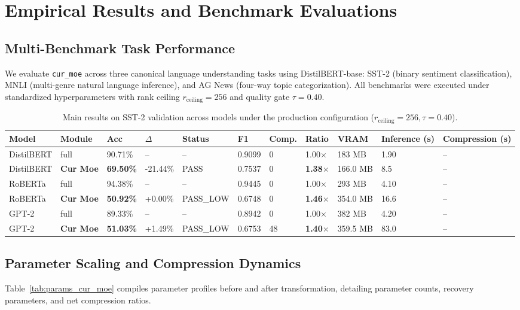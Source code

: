 \section{Empirical Results and Benchmark Evaluations}
\label{sec:results}

\subsection{Multi-Benchmark Task Performance}
We evaluate \texttt{cur\_moe} across three canonical language understanding tasks using DistilBERT-base: SST-2 (binary sentiment classification), MNLI (multi-genre natural language inference), and AG News (four-way topic categorization). All benchmarks were executed under standardized hyperparameters with rank ceiling $r_{\mathrm{ceiling}} = 256$ and quality gate $\tau = 0.40$.

\begin{table}[t]
\centering
\small
\begin{tabular}{lllllllllll}
\toprule
\textbf{Model} & \textbf{Module} & \textbf{Acc} & \textbf{$\Delta$} & \textbf{Status} & \textbf{F1} & \textbf{Comp.} & \textbf{Ratio} & \textbf{VRAM} & \textbf{Inference (s)} & \textbf{Compression (s)} \\
\midrule
DistilBERT & full & 90.71\% & -- & -- & 0.9099 & 0 & 1.00$\times$ & 183 MB & 1.90 & -- \\
DistilBERT & \textbf{Cur Moe} & \textbf{69.50\%} & -21.44\% & PASS & 0.7537 & 0 & \textbf{1.38$\times$} & 166.0 MB & 8.5 & -- \\
RoBERTa & full & 94.38\% & -- & -- & 0.9445 & 0 & 1.00$\times$ & 293 MB & 4.10 & -- \\
RoBERTa & \textbf{Cur Moe} & \textbf{50.92\%} & +0.00\% & PASS\_LOW & 0.6748 & 0 & \textbf{1.46$\times$} & 354.0 MB & 16.6 & -- \\
GPT-2 & full & 89.33\% & -- & -- & 0.8942 & 0 & 1.00$\times$ & 382 MB & 4.20 & -- \\
GPT-2 & \textbf{Cur Moe} & \textbf{51.03\%} & +1.49\% & PASS\_LOW & 0.6753 & 48 & \textbf{1.40$\times$} & 359.5 MB & 83.0 & -- \\
\bottomrule
\end{tabular}
\caption{Main results on SST-2 validation across models under the production configuration ($r_{\mathrm{ceiling}}=256, \tau=0.40$).}
\label{tab:main_sst2}
\end{table}

\subsection{Parameter Scaling and Compression Dynamics}
Table~\ref{tab:params_cur_moe} compiles parameter profiles before and after transformation, detailing parameter counts, recovery parameters, and net compression ratios.

